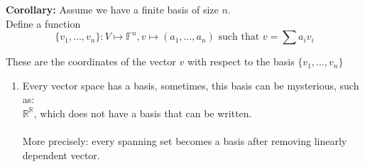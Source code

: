 \documentclass[12pt]{article}
\begin{document}
\textbf{Corollary:} Assume we have a finite basis of size $n$.\\
Define a function
$$\{v_1, ..., v_n \} : V \mapsto \mathbb{F}^n, v \mapsto (a_1, ... , a_n) \text{ such that } v = \sum a_i v_i$$

These are the coordinates of the vector $v$ with respect to the basis $\{v_1, ..., v_n \}$

\begin{enumerate}
	\item{
	Every vector space has a basis, sometimes, this basis can be mysterious, such as:\\
	$\mathbb{R}^{\mathbb{R}}$, which does not have a basis that can be written.\\
	\\
	More precisely: every spanning set becomes a basis after removing linearly dependent vector.
	}
\end{enumerate}
\end{document}
